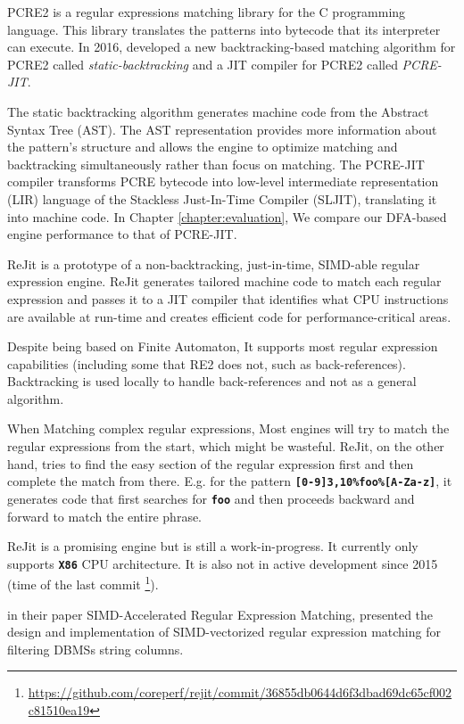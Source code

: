 PCRE2 \cite{pcre2} is a regular expressions matching library for the C programming language. This library translates the patterns into bytecode that its interpreter can execute. In 2016, \citet{pcre2_jit} developed a new backtracking-based matching algorithm for PCRE2 called \textit{static-backtracking} and a JIT compiler for PCRE2 called \textit{PCRE-JIT}.

The static backtracking algorithm generates machine code from the Abstract Syntax Tree (AST). The AST representation provides more information about the pattern's structure and allows the engine to optimize matching and backtracking simultaneously rather than focus on matching. The PCRE-JIT compiler transforms PCRE bytecode into low-level intermediate representation (LIR) language of the Stackless Just-In-Time Compiler (SLJIT), translating it into machine code. In Chapter \ref{chapter:evaluation}, We compare our DFA-based engine performance to that of PCRE-JIT.

ReJit \cite{rejit} is a prototype of a non-backtracking, just-in-time, SIMD-able regular expression engine. ReJit generates tailored machine code to match each regular expression and passes it to a JIT compiler that identifies what CPU instructions are available at run-time and creates efficient code for performance-critical areas.

Despite being based on Finite Automaton, It supports most regular expression capabilities (including some that RE2 does not, such as back-references). Backtracking is used locally to handle back-references and not as a general algorithm.

When Matching complex regular expressions, Most engines will try to match the regular expressions from the start, which might be wasteful. ReJit, on the other hand, tries to find the easy section of the regular expression first and then complete the match from there. E.g. for the pattern \texttt{\textbf{[0-9]{3,10}\%foo\%[A-Za-z]}}, it generates code that first searches for \texttt{\textbf{foo}} and then proceeds backward and forward to match the entire phrase.

ReJit is a promising engine but is still a work-in-progress. It currently only supports \texttt{\textbf{X86}} CPU architecture. It is also not in active development since 2015 (time of the last commit \footnote{\url{https://github.com/coreperf/rejit/commit/36855db0644d6f3dbad69dc65cf002c81510ea19}}).

\citet{simdregextpch} in their paper SIMD-Accelerated Regular Expression Matching, presented the design and implementation of SIMD-vectorized regular expression matching for filtering DBMSs string columns. 

